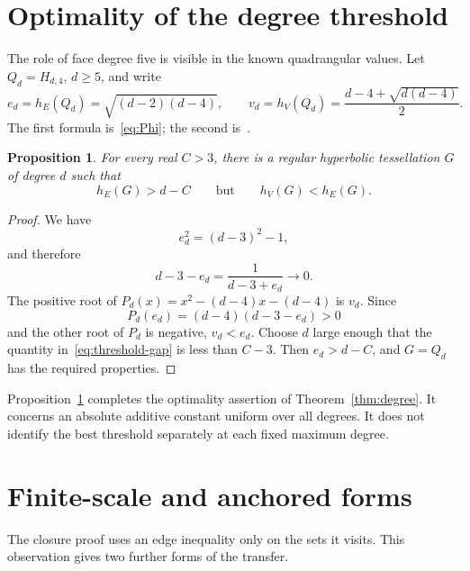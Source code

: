 \documentclass[11pt]{amsart}
\numberwithin{equation}{section}
\newtheorem{proposition}[theorem]{Proposition}
\theoremstyle{definition}
\theoremstyle{remark}
\newcommand{\hE}{h_E}
\newcommand{\hV}{h_V}
\begin{document}
\section{Optimality of the degree threshold}\label{sec:sharpness}
The role of face degree five is visible in the known quadrangular values. Let $Q_d=H_{d,4}$, $d\ge5$, and write
\[
e_d=\hE(Q_d)=\sqrt{(d-2)(d-4)},\qquad
v_d=\hV(Q_d)=\frac{d-4+\sqrt{d(d-4)}}2.
\]
The first formula is~\eqref{eq:Phi}; the second is~\cite[Theorem~23 and recurrence~(5)]{HP}.

\begin{proposition}\label{prop:sharp-threshold}
For every real $C>3$, there is a regular hyperbolic tessellation $G$ of degree $d$ such that
\[
\hE(G)>d-C\qquad\text{but}\qquad\hV(G)<\hE(G).
\]
\end{proposition}
\begin{proof}
We have
\[
e_d^2=(d-3)^2-1,
\]
and therefore
\begin{equation}\label{eq:threshold-gap}
d-3-e_d=\frac1{d-3+e_d}\longrightarrow0.
\end{equation}
The positive root of $P_d(x)=x^2-(d-4)x-(d-4)$ is $v_d$. Since
\[
P_d(e_d)=(d-4)(d-3-e_d)>0
\]
and the other root of $P_d$ is negative, $v_d<e_d$. Choose $d$ large enough that the quantity in~\eqref{eq:threshold-gap} is less than $C-3$. Then $e_d>d-C$, and $G=Q_d$ has the required properties.
\end{proof}

Proposition~\ref{prop:sharp-threshold} completes the optimality assertion of Theorem~\ref{thm:degree}. It concerns an absolute additive constant uniform over all degrees. It does not identify the best threshold separately at each fixed maximum degree.

\section{Finite-scale and anchored forms}\label{sec:variants}
The closure proof uses an edge inequality only on the sets it visits. This observation gives two further forms of the transfer.
\end{document}

